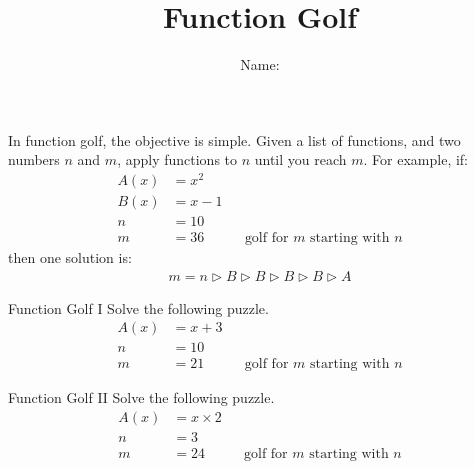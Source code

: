 \documentclass[12pt,letterpaper]{article}
\title{Function Golf}
\author{Name: \underline{\hspace{5cm}}}
\begin{document}
\HomeworkTitle

\thispagestyle{empty}

In function golf, the objective is simple. Given a list of functions, and two
numbers $n$ and $m$, apply functions to $n$ until you reach $m$. For example,
if:
\begin{align*}
 A(x) &= x^2 \\
 B(x) &= x-1 \\
 n &= 10 \\
 m &= 36 && \text{golf for $m$ starting with $n$}
\end{align*}
then one solution is:
\begin{align*}
 m = n \rhd B \rhd B \rhd B \rhd B \rhd A
\end{align*}

\begin{problem}{Function Golf I}
 Solve the following puzzle.
 \begin{align*}
  A(x) &= x + 3 \\
  n &= 10 \\
  m &= 21 && \text{golf for $m$ starting with $n$}
 \end{align*}
\end{problem}

\begin{problem}{Function Golf II}
 Solve the following puzzle.
 \begin{align*}
  A(x) &= x \times 2 \\
  n &= 3 \\
  m &= 24 && \text{golf for $m$ starting with $n$}
 \end{align*}
\end{problem}
\end{document}

